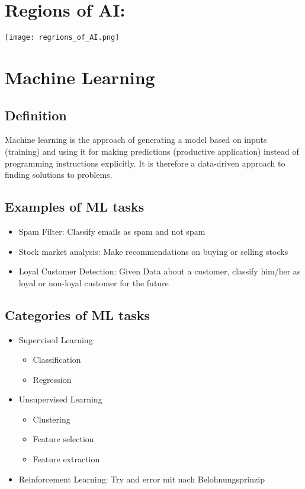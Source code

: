 \section{Regions of AI:}

\texttt{[image: regrions\_of\_AI.png]}

\section{Machine Learning}

\subsection{Definition}

Machine learning is the approach of generating a model based on inputs (training) and using it for making predictions (productive application) instead of programming instructions explicitly. It is therefore a data-driven approach to finding solutions to problems.

\subsection{Examples of ML tasks}

\begin{itemize}
    \item Spam Filter: Classify emails as spam and not spam
    \item Stock market analysis: Make recommendations on buying or selling stocks
    \item Loyal Customer Detection: Given Data about a customer, classify him/her as loyal or non-loyal customer for the future
\end{itemize}

\subsection{Categories of ML tasks}

\begin{itemize}
    \item Supervised Learning
          \begin{itemize}
              \item Classification
              \item Regression
          \end{itemize}
    \item Unsupervised Learning
          \begin{itemize}
              \item Clustering
              \item Feature selection
              \item Feature extraction
          \end{itemize}
    \item Reinforcement Learning: Try and error mit nach Belohnungsprinzip
\end{itemize}

